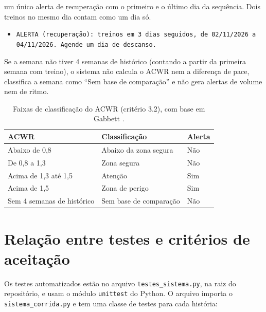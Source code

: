 \documentclass[12pt,a4paper]{article}
\begin{document}
\begin{criterios}[label=\textbf{3.\arabic*:}]
        um único alerta de recuperação com o primeiro e o último dia da sequência. Dois
        treinos no mesmo dia contam como um dia só.
        \begin{itemize}[itemsep=2pt, before=\raggedright\small]
          \item \texttt{ALERTA (recuperação): treinos em 3 dias seguidos, de 02/11/2026 a 04/11/2026. Agende um dia de descanso.}
        \end{itemize}
  \item Se a semana não tiver 4 semanas de histórico (contando a partir da primeira
        semana com treino), o sistema não calcula o ACWR nem a diferença de pace,
        classifica a semana como ``Sem base de comparação'' e não gera alertas de volume
        nem de ritmo.
\end{criterios}

\begin{table}[H]
  \centering
  \caption{Faixas de classificação do ACWR (critério 3.2), com base em
           Gabbett \cite{gabbett2016}.}
  \label{tab:acwr}
  \begin{tabular}{lll}
    \toprule
    \textbf{ACWR} & \textbf{Classificação} & \textbf{Alerta} \\
    \midrule
    Abaixo de 0,8              & Abaixo da zona segura   & Não \\
    De 0,8 a 1,3               & Zona segura             & Não \\
    Acima de 1,3 até 1,5       & Atenção                 & Sim \\
    Acima de 1,5               & Zona de perigo          & Sim \\
    Sem 4 semanas de histórico & Sem base de comparação  & Não \\
    \bottomrule
  \end{tabular}
\end{table}

\section{Relação entre testes e critérios de aceitação}

Os testes automatizados estão no arquivo \texttt{testes\_sistema.py}, na raiz do
repositório, e usam o módulo \texttt{unittest} do Python. O arquivo importa o
\texttt{sistema\_corrida.py} e tem uma classe de testes para cada história:
\end{document}
